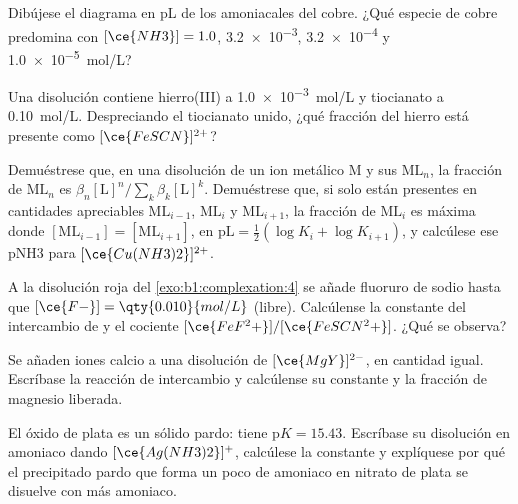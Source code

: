 \begin{exercise}[$\star$]\label{exo:b1:complexation:3}
Dibújese el diagrama en pL de los  amoniacales del cobre. ¿Qué
especie de cobre predomina con $[\ce{NH3}] = 1.0$, \num{3.2e-3},
\num{3.2e-4} y \qty{1.0e-5}{mol/L}?
\end{exercise}

\begin{exercise}[$\star$]\label{exo:b1:complexation:4}
Una disolución contiene hierro(III) a \qty{1.0e-3}{mol/L} y tiocianato a
\qty{0.10}{mol/L}. Despreciando el tiocianato unido, ¿qué fracción del
hierro está presente como $[\ce{FeSCN}]^{2+}$?
\end{exercise}

\begin{exercise}[$\star\star$]\label{exo:b1:complexation:5}
Demuéstrese que, en una disolución de un ion metálico M y sus 
$\mathrm{ML}_n$, la fracción de $\mathrm{ML}_n$ es
$\beta_n[\mathrm{L}]^n / \sum_{k} \beta_k[\mathrm{L}]^k$. Demuéstrese que,
si solo están presentes en cantidades apreciables $\mathrm{ML}_{i-1}$,
$\mathrm{ML}_i$ y $\mathrm{ML}_{i+1}$, la fracción de $\mathrm{ML}_i$ es
máxima donde $[\mathrm{ML}_{i-1}] = [\mathrm{ML}_{i+1}]$, en
$\mathrm{pL} = \frac12(\log K_i + \log K_{i+1})$, y calcúlese ese pNH3
para $[\ce{Cu(NH3)2}]^{2+}$.
\end{exercise}

\begin{exercise}[$\star\star$]\label{exo:b1:complexation:6}
A la disolución roja del \cref{exo:b1:complexation:4} se añade fluoruro
de sodio hasta que $[\ce{F-}] = \qty{0.010}{mol/L}$ (libre). Calcúlense la
constante del intercambio de  y el cociente
$[\ce{FeF^2+}]/[\ce{FeSCN^2+}]$. ¿Qué se observa?
\end{exercise}

\begin{exercise}[$\star\star$]\label{exo:b1:complexation:7}
Se añaden iones calcio a una disolución de $[\ce{MgY}]^{2-}$, en cantidad
igual. Escríbase la reacción de intercambio y calcúlense su constante y
la fracción de magnesio liberada.
\end{exercise}

\begin{exercise}[$\star\star$]\label{exo:b1:complexation:8}
El óxido de plata  es un sólido pardo: 
tiene $\mathrm{p}K = 15.43$. Escríbase su disolución en amoniaco dando
$[\ce{Ag(NH3)2}]^{+}$, calcúlese la constante y explíquese por qué el
precipitado pardo que forma un poco de amoniaco en nitrato de plata se
disuelve con más amoniaco.
\end{exercise}

